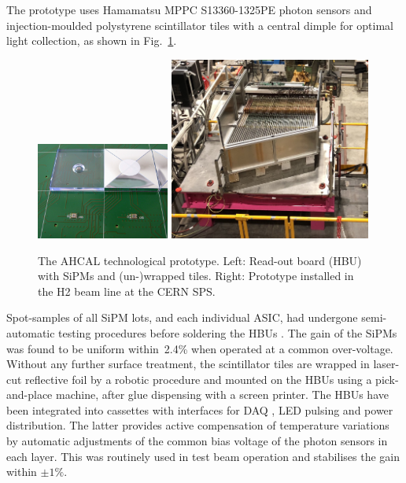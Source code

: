 The prototype uses Hamamatsu MPPC S13360-1325PE photon sensors and injection-moulded polystyrene scintillator tiles with a central dimple \cite{Liu:2015cpe} for optimal light collection, as shown in Fig.~\ref{fig:AHCAL-TileProto}. 
\begin{figure}[hbt]
\centering
\includegraphics[width=0.39\textwidth]{Detector/fig/hcal-tiles.jpeg}
\includegraphics[width=0.59\textwidth]{Detector/fig/AHCAL-prototype.jpeg}
\caption{The AHCAL technological prototype. Left: Read-out board (HBU) with SiPMs and (un-)wrapped tiles. Right: Prototype installed in the H2 beam line at the CERN SPS.} 
\label{fig:AHCAL-TileProto}
\end{figure}
%
Spot-samples of all SiPM lots, and each individual ASIC, had undergone semi-automatic testing procedures before soldering the HBUs \cite{Munwes:2634923}. The gain of the SiPMs was found to be uniform within~2.4\% when operated at a common over-voltage.
Without any further surface treatment, the scintillator tiles are wrapped in laser-cut reflective foil by a robotic procedure and mounted on the HBUs using a pick-and-place machine, after glue dispensing with a screen printer.   
%
The HBUs have been integrated into cassettes with interfaces for DAQ \cite{Kvasnicka:2017bpx}, LED pulsing and power distribution. The latter provides active compensation of temperature variations by automatic adjustments of the common bias voltage of the photon sensors in each layer. This was routinely used in test beam operation and stabilises the gain within $\pm 1\%$.
